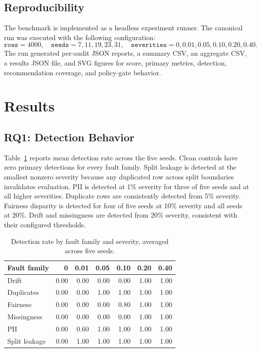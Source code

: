 \documentclass[runningheads]{llncs}
\begin{document}
\subsection{Reproducibility}

The benchmark is implemented as a headless experiment runner. The canonical run
was executed with the following configuration:
\[
\texttt{rows}=4000,\quad
\texttt{seeds}=7,11,19,23,31,\quad
\texttt{severities}=0,0.01,0.05,0.10,0.20,0.40.
\]
The run generated per-audit JSON reports, a summary CSV, an aggregate CSV, a
results JSON file, and SVG figures for score, primary metrics, detection,
recommendation coverage, and policy-gate behavior.

\section{Results}

\subsection{RQ1: Detection Behavior}

Table~\ref{tab:detection-rate} reports mean detection rate across the five seeds.
Clean controls have zero primary detections for every fault family. Split leakage
is detected at the smallest nonzero severity because any duplicated row across
split boundaries invalidates evaluation. PII is detected at 1\% severity for
three of five seeds and at all higher severities. Duplicate rows are consistently
detected from 5\% severity. Fairness disparity is detected for four of five seeds
at 10\% severity and all seeds at 20\%. Drift and missingness are detected from
20\% severity, consistent with their configured thresholds.

\begin{table}
\centering
\caption{Detection rate by fault family and severity, averaged across five seeds.}
\label{tab:detection-rate}
\scriptsize
\begin{tabular}{lrrrrrr}
\toprule
Fault family & 0 & 0.01 & 0.05 & 0.10 & 0.20 & 0.40 \\
\midrule
Drift & 0.00 & 0.00 & 0.00 & 0.00 & 1.00 & 1.00 \\
Duplicates & 0.00 & 0.00 & 1.00 & 1.00 & 1.00 & 1.00 \\
Fairness & 0.00 & 0.00 & 0.00 & 0.80 & 1.00 & 1.00 \\
Missingness & 0.00 & 0.00 & 0.00 & 0.00 & 1.00 & 1.00 \\
PII & 0.00 & 0.60 & 1.00 & 1.00 & 1.00 & 1.00 \\
Split leakage & 0.00 & 1.00 & 1.00 & 1.00 & 1.00 & 1.00 \\
\bottomrule
\end{tabular}
\end{table}
\end{document}
